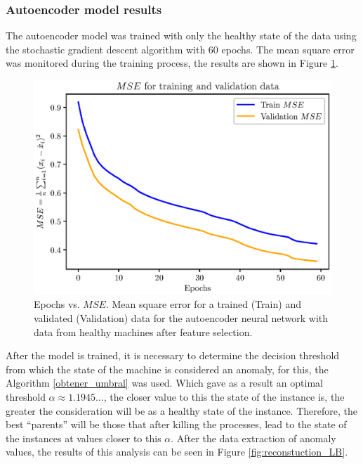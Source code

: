 \documentclass{iosart2c}
\begin{document}
\subsubsection{Autoencoder model results}\label{results_autoencoder}

The autoencoder model was trained with only the healthy state of the data using the stochastic gradient descent algorithm with 60 epochs. The mean square error was monitored during the training process, the results are shown in Figure \ref{fig:autoencoder_variable_selected}.\\



\begin{figure}[h!]
\centering
\includegraphics[scale=0.56]{figs/autoencoder/final_autoencoder.eps}
\caption{Epochs vs. $MSE$. Mean square error for a trained (Train) and validated (Validation) data for the autoencoder neural network with data from healthy machines after feature selection.}
\label{fig:autoencoder_variable_selected}
\end{figure}

After the model is trained, it is necessary to determine the decision threshold from which the state of the machine is considered an anomaly, for this, the Algorithm \ref{obtener_umbral} was used. Which gave as a result an optimal threshold $\alpha\approx 1.1945\ldots$, the closer value to this the state of the instance is, the greater the consideration will be as a healthy state of the instance. Therefore, the best ``parents'' will be those that after killing the processes, lead to the state of the instances at values closer to this $\alpha$. After the data extraction of anomaly values, the results of this analysis can be seen in Figure \ref{fig:reconstuction_LB}.\\
\end{document}

